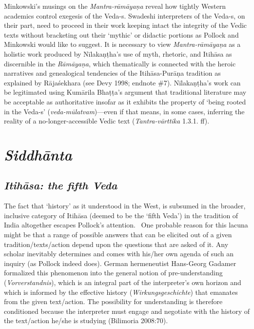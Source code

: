 Minkowski’s musings on the \textit{Mantra-rāmāyaṇa} reveal how tightly Western academics control exegesis of the Veda-s. Swadeshi interpreters of the Veda-s, on their part, need to proceed in their work keeping intact the integrity of the Vedic texts without bracketing out their ‘mythic’ or didactic portions as Pollock and Minkowski would like to suggest. It is necessary to view \textit{Mantra-rāmāyaṇa} as a holistic work produced by Nīlakaṇṭha’s use of myth, rhetoric, and Itihāsa as discernible in the \textit{Rāmāyaṇa}, which thematically is connected with the heroic narratives and genealogical tendencies of the Itihāsa-Purāṇa tradition as explained by Rājaśekhara (see Devy 1998; endnote \#7). Nīlakaṇṭha’s work can be legitimated using Kumārila Bhaṭṭa’s argument that traditional literature may be acceptable as authoritative insofar as it exhibits the property of ‘being rooted in the Veda-s’ (\textit{veda-mūlatvam})—even if that means, in some cases, inferring the reality of a no-longer-accessible Vedic text (\textit{Tantra-vārttika} 1.3.1. ff).


\section*{\textit{Siddhānta}}

\subsection*{\textit{Itihāsa: the fifth Veda}}

The fact that ‘history’ as it understood in the West, is subsumed in the broader, inclusive category of Itihāsa (deemed to be the ‘fifth Veda’) in the tradition of India altogether escapes Pollock’s attention.  One probable reason for this lacuna might be that a range of possible answers that can be elicited out of a given tradition/texts/action depend upon the questions that are asked of it. Any scholar inevitably determines and comes with his/her own agenda of such an inquiry (as Pollock indeed does). German hermeneutist Hans-Georg Gadamer formalized this phenomenon into the general notion of pre-understanding (\textit{Vorverstandnis}), which is an integral part of the interpreter’s own horizon and which is informed by the effective history (\textit{Wirkungsgeschichte}) that emanates from the given text/action. The possibility for understanding is therefore conditioned because the interpreter must engage and negotiate with the history of the text/action he/she is studying (Bilimoria 2008:70). 

